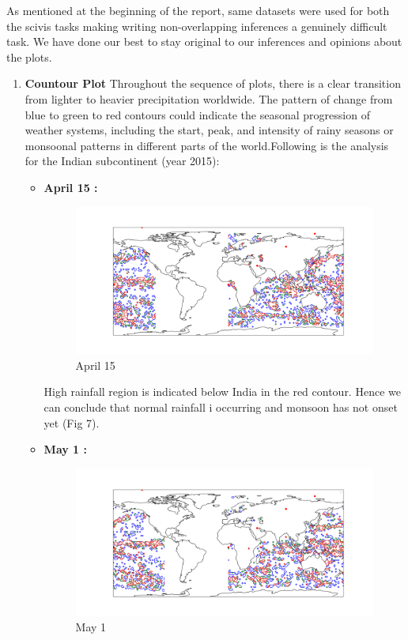 \documentclass[conference]{IEEEtran}
\begin{document}
As mentioned at the beginning of the report, same datasets were used for both the scivis tasks making writing non-overlapping inferences a genuinely difficult task. We have done our best to stay original to our inferences and opinions about the plots.
\begin{enumerate}

\item \textbf{Countour Plot}
Throughout the sequence of plots, there is a clear transition from lighter to heavier precipitation worldwide. The pattern of change from blue to green to red contours could indicate the seasonal progression of weather systems, including the start, peak, and intensity of rainy seasons or monsoonal patterns in different parts of the world.Following is the analysis for the Indian subcontinent (year 2015):
    \begin{itemize}
     

    \item \textbf{April 15 :} 
    \begin{figure}
        \centering
        \includegraphics[width=1\linewidth]{Apr15.png}
        \caption{April 15}
        \label{fig:enter-label}
    \end{figure}
    
    High rainfall region is indicated below India in the red contour.
    Hence we can conclude that normal rainfall i occurring and monsoon has not onset yet (Fig 7).

    \item \textbf{May 1 :} 
    \begin{figure}
        \centering
        \includegraphics[width=1\linewidth]{May1.png}
        \caption{May 1}
        \label{fig:enter-label}
    \end{figure}
    

\end{itemize}
\end{enumerate}
\end{document}
